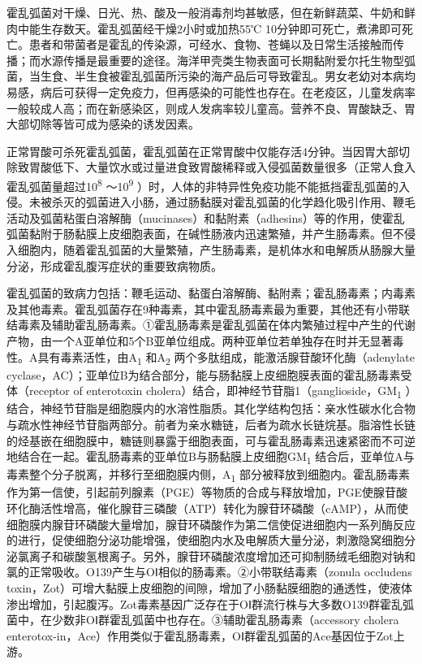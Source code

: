 霍乱弧菌对干燥、日光、热、酸及一般消毒剂均甚敏感，但在新鲜蔬菜、牛奶和鲜肉中能生存数天。霍乱弧菌经干燥2小时或加热55℃
10分钟即可死亡，煮沸即可死亡。患者和带菌者是霍乱的传染源，可经水、食物、苍蝇以及日常生活接触而传播；而水源传播是最重要的途径。海洋甲壳类生物表面可长期黏附爱尔托生物型弧菌，当生食、半生食被霍乱弧菌所污染的海产品后可导致霍乱。男女老幼对本病均易感，病后可获得一定免疫力，但再感染的可能性也存在。在老疫区，儿童发病率一般较成人高；而在新感染区，则成人发病率较儿童高。营养不良、胃酸缺乏、胃大部切除等皆可成为感染的诱发因素。

正常胃酸可杀死霍乱弧菌，霍乱弧菌在正常胃酸中仅能存活4分钟。当因胃大部切除致胃酸低下、大量饮水或过量进食致胃酸稀释或入侵弧菌数量很多（正常人食入霍乱弧菌量超过10\textsuperscript{8}
～10\textsuperscript{9}
）时，人体的非特异性免疫功能不能抵挡霍乱弧菌的入侵。未被杀灭的弧菌进入小肠，通过肠黏膜对霍乱弧菌的化学趋化吸引作用、鞭毛活动及弧菌粘蛋白溶解酶（mucinases）和黏附素（adhesins）等的作用，使霍乱弧菌黏附于肠黏膜上皮细胞表面，在碱性肠液内迅速繁殖，并产生肠毒素。但不侵入细胞内，随着霍乱弧菌的大量繁殖，产生肠毒素，是机体水和电解质从肠腺大量分泌，形成霍乱腹泻症状的重要致病物质。

霍乱弧菌的致病力包括：鞭毛运动、黏蛋白溶解酶、黏附素；霍乱肠毒素；内毒素及其他毒素。霍乱弧菌存在9种毒素，其中霍乱肠毒素最为重要，其他还有小带联结毒素及辅助霍乱肠毒素。①霍乱肠毒素是霍乱弧菌在体内繁殖过程中产生的代谢产物，由一个A亚单位和5个B亚单位组成。两种亚单位若单独存在时并无显著毒性。A具有毒素活性，由A\textsubscript{1}
和A\textsubscript{2} 两个多肽组成，能激活腺苷酸环化酶（adenylate
cyclase，AC）；亚单位B为结合部分，能与肠黏膜上皮细胞膜表面的霍乱肠毒素受体（receptor
of enterotoxin
cholera）结合，即神经节苷脂1（ganglioside，GM\textsubscript{1}
）结合，神经节苷脂是细胞膜内的水溶性脂质。其化学结构包括：亲水性碳水化合物与疏水性神经节苷脂两部分。前者为亲水糖链，后者为疏水长链烷基。脂溶性长链的烃基嵌在细胞膜中，糖链则暴露于细胞表面，可与霍乱肠毒素迅速紧密而不可逆地结合在一起。霍乱肠毒素的亚单位B与肠黏膜上皮细胞GM\textsubscript{1}
结合后，亚单位A与毒素整个分子脱离，并移行至细胞膜内侧，A\textsubscript{1}
部分被释放到细胞内。霍乱肠毒素作为第一信使，引起前列腺素（PGE）等物质的合成与释放增加，PGE使腺苷酸环化酶活性增高，催化腺苷三磷酸（ATP）转化为腺苷环磷酸（cAMP），从而使细胞膜内腺苷环磷酸大量增加，腺苷环磷酸作为第二信使促进细胞内一系列酶反应的进行，促使细胞分泌功能增强，使细胞内水及电解质大量分泌，刺激隐窝细胞分泌氯离子和碳酸氢根离子。另外，腺苷环磷酸浓度增加还可抑制肠绒毛细胞对钠和氯的正常吸收。O139产生与OⅠ相似的肠毒素。②小带联结毒素（zonula
occludens
toxin，Zot）可增大黏膜上皮细胞的间隙，增加了小肠黏膜细胞的通透性，使液体渗出增加，引起腹泻。Zot毒素基因广泛存在于OⅠ群流行株与大多数O139群霍乱弧菌中，在少数非OⅠ群霍乱弧菌中也存在。③辅助霍乱肠毒素（accessory
cholera
enterotox-in，Ace）作用类似于霍乱肠毒素，OⅠ群霍乱弧菌的Ace基因位于Zot上游。


